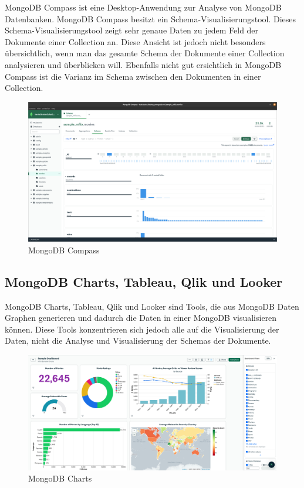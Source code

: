MongoDB Compass ist eine Desktop-Anwendung zur Analyse von MongoDB Datenbanken.
MongoDB Compass besitzt ein Schema-Visualisierungstool.
Dieses Schema-Visualisierungstool zeigt sehr genaue Daten zu jedem Feld der Dokumente einer Collection an.
Diese Ansicht ist jedoch nicht besonders übersichtlich, wenn man das gesamte Schema der Dokumente einer Collection analysieren und überblicken will.
Ebenfalls nicht gut ersichtlich in MongoDB Compass ist die Varianz im Schema zwischen den Dokumenten in einer Collection.
\begin{figure}[H]
    \includegraphics[width=\textwidth]{images/mongodb_compass}
    \caption{MongoDB Compass}
    \label{fig:mongodb_compass}
\end{figure}

\subsection{MongoDB Charts, Tableau, Qlik und Looker}
\label{sub:mongodb_charts}

MongoDB Charts, Tableau, Qlik und Looker sind Tools, die aus MongoDB Daten Graphen generieren und dadurch die Daten in einer MongoDB visualisieren können.
Diese Tools konzentrieren sich jedoch alle auf die Visualisierung der Daten, nicht die Analyse und Visualisierung der Schemas der Dokumente.
\begin{figure}[H]
    \includegraphics[width=\textwidth]{images/mongodb_charts}
    \caption{MongoDB Charts}
    \label{fig:mongodb_charts}
\end{figure}


